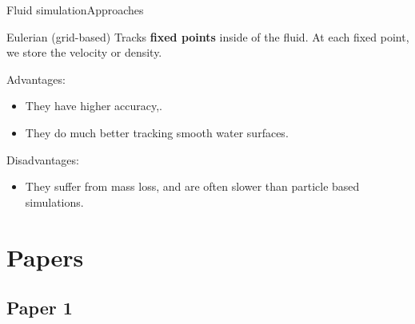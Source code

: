 \documentclass[10pt]{beamer}
\newcommand{\1}{
        	\setbeamertemplate{background}{
        		\texttt{[image: img/1]}
        		\tikz[overlay] \fill[fill opacity=0.75,fill=white] (0,0) rectangle (-\paperwidth,\paperheight);
        	}
}
\begin{document}
\begin{frame}{Fluid simulation}{Approaches}	

	\begin{block}{Eulerian (grid-based)}
		Tracks \textbf{fixed points} inside of the fluid. At each fixed point, we store the velocity or density. 
	\end{block}

	Advantages: 
	\begin{itemize}
		\item They have higher  accuracy,.
		\item They do much better tracking smooth water surfaces.
		
	\end{itemize}
	
	Disadvantages: 
	\begin{itemize}
		\item They suffer from mass loss, and are often slower than particle based simulations.
	\end{itemize}
\end{frame}

\section{Papers}


\subsection{Paper 1}
\end{document}

